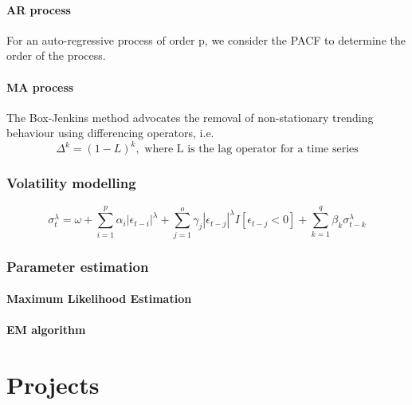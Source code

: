 \documentclass[12pt,a4paper]{cibb}
\begin{document}
\paragraph{\textbf{AR process}} For an auto-regressive process of order p, we consider the PACF to determine the order of the process.  

\paragraph{\textbf{MA process}}

The Box-Jenkins method advocates the removal of non-stationary trending behaviour using differencing operators, i.e. \[\Delta^k= (1 - L)^k, \text{ where L is the lag operator for a time series}\] 

\subsubsection{Volatility modelling}

\[\sigma_{t}^{\lambda}=\omega
        + \sum_{i=1}^{p}\alpha_{i}\left|\epsilon_{t-i}\right|^{\lambda}
        +\sum_{j=1}^{o}\gamma_{j}\left|\epsilon_{t-j}\right|^{\lambda}
        I\left[\epsilon_{t-j}<0\right]+\sum_{k=1}^{q}\beta_{k}\sigma_{t-k}^{\lambda}\]

\subsubsection{Parameter estimation}
\paragraph{\textbf{Maximum Likelihood Estimation}}
\paragraph{EM algorithm }

\section{Projects}
\end{document}

